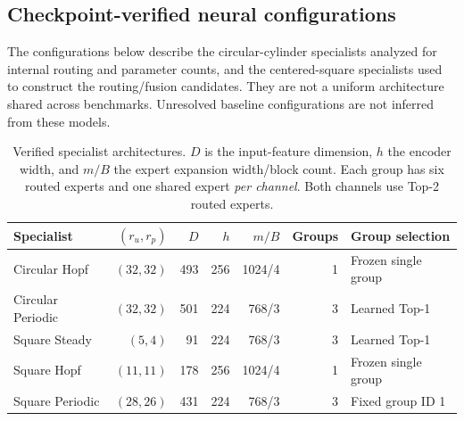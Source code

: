 
\subsection{Checkpoint-verified neural configurations}
The configurations below describe the circular-cylinder specialists analyzed
for internal routing and parameter counts, and the centered-square specialists
used to construct the routing/fusion candidates. They are not a uniform
architecture shared across benchmarks. Unresolved baseline configurations are
not inferred from these models.

\begin{table}[htbp]
\centering\small
\setlength{\tabcolsep}{4pt}
\caption{Verified specialist architectures. $D$ is the input-feature dimension,
$h$ the encoder width, and $m/B$ the expert expansion width/block count.
Each group has six routed experts and one shared expert \emph{per channel}.
Both channels use Top-2 routed experts.}
\label{tab:audit_specialist_architecture}
\begin{tabular}{@{}lrrrrrl@{}}
\toprule
Specialist & $(r_u,r_p)$ & $D$ & $h$ & $m/B$ & Groups & Group selection \\
\midrule
Circular Hopf & $(32,32)$ & 493 & 256 & 1024/4 & 1 & Frozen single group \\
Circular Periodic & $(32,32)$ & 501 & 224 & 768/3 & 3 & Learned Top-1 \\
Square Steady & $(5,4)$ & 91 & 224 & 768/3 & 3 & Learned Top-1 \\
Square Hopf & $(11,11)$ & 178 & 256 & 1024/4 & 1 & Frozen single group \\
Square Periodic & $(28,26)$ & 431 & 224 & 768/3 & 3 & Fixed group ID 1 \\
\bottomrule
\end{tabular}
\end{table}

